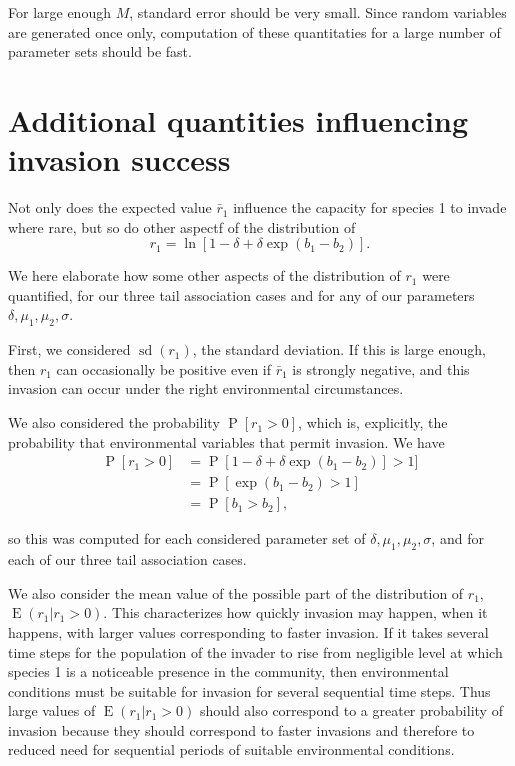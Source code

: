 \documentclass[letterpaper,11pt]{article}
\DeclareMathOperator{\EX}{E}%
\DeclareMathOperator{\sd}{sd}
\DeclareMathOperator{\Prob}{P}
\begin{document}
\noindent For large enough $M$, standard error should be very small. Since random variables are generated once only, computation of these quantitaties for a large number of parameter sets should be fast. 


\section{Additional quantities influencing invasion success} \label{sect:addquant}

Not only does the expected value $\bar r_1$ influence the capacity for species 1 to invade where rare, but so do other aspectf of the distribution of
\begin{equation}
r_1 = \ln[1-\delta+\delta \exp(b_1-b_2)]. \label{r1_distribution}
\end{equation}

We here elaborate how some other aspects of the distribution of $r_1$ were quantified, for our three tail association cases and for any of our parameters $\delta, \mu_1, \mu_2, \sigma$. 

First, we considered $\sd(r_1)$, the standard deviation. If this is large enough, then $r_1$ can occasionally be positive even if $\bar r_1$ is strongly negative, and this invasion can occur under the right environmental circumstances.

We also considered the probability $\Prob[r_1 >0]$, which is, explicitly, the probability that environmental variables that permit invasion. We have
\begin{align}
\Prob[r_1>0] &= \Prob [1-\delta+\delta \exp(b_1-b_2)] > 1] \\
&= \Prob[\exp (b_1-b_2)>1] \\
&= \Prob[b_1>b_2],
\end{align}

\noindent so this was computed for each considered parameter set of $\delta, \mu_1, \mu_2, \sigma$, and for each of our three tail association cases. 

We also consider the mean value of the possible part of the distribution of $r_1$, $\EX(r_1|r_1>0)$. This characterizes how quickly invasion may happen, when it happens, with larger values corresponding to faster invasion. If it takes several time steps for the population of the invader to rise from negligible level at which species 1 is a noticeable presence in the community, then environmental conditions must be suitable for invasion for several sequential time steps. Thus large values of $\EX(r_1|r_1>0)$ should also correspond to a greater probability of invasion because they should correspond to faster invasions and therefore to reduced need for sequential periods of suitable environmental conditions. 
\end{document}
